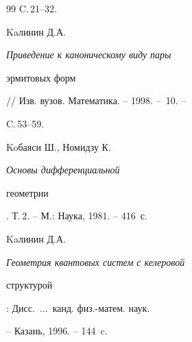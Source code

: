 \begin{thebibliography}{99}
C.\,21--32.


 Kaлинин Д.А. {\em Приведение к каноническому виду пары


эрмитовых форм} // Изв. вузов. Математика. -- 1998. -- \No\,10. --


C.\,53--59.


 Koбаяси Ш., Номидзу К. {\em Основы дифференциальной


геометрии}. Т.\,2. -- М.: Наука, 1981. -- 416~с.


 Kaлинин Д.А. {\em Геометрия квантовых систем с келеровой


структурой}: Дисс.~$\dotsc$~канд. физ.-матем. наук.


-- Казань, 1996. -- 144~c.





\end{thebibliography}





\vskip 2cm












\label{end}











